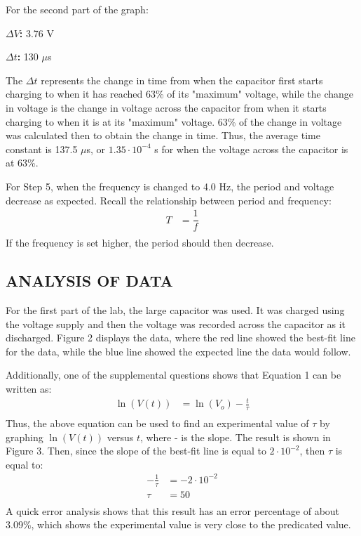 \documentclass [12pt, letterpaper, twoside] {article}
\begin{document}
\noindent
For the second part of the graph:

\textbf{\(\Delta{V}\):} 3.76 V

\textbf{\(\Delta{t}\):} 130 \(\mu\)s

\noindent
The \(\Delta{t}\) represents the change in time from when the capacitor first starts charging to when it has reached 63\% of its "maximum" voltage, while the change in voltage is the change in voltage across the capacitor from when it starts charging to when it is at its "maximum" voltage. 63\% of the change in voltage was calculated then to obtain the change in time. Thus, the average time constant is 137.5 \(\mu\)s, or \(1.35\cdot{10}^{-4}\) s for when the voltage across the capacitor is at 63\%.

\noindent
For Step 5, when the frequency is changed to 4.0 Hz, the period and voltage decrease as expected. Recall the relationship between period and frequency:
\begin{equation*}
  \begin{split}
    T &= \dfrac{1}{f} \\
  \end{split}
\end{equation*}
If the frequency is set higher, the period should then decrease.

\subsection* {ANALYSIS OF DATA}
For the first part of the lab, the large capacitor was used. It was charged using the voltage supply and then the voltage was recorded across the capacitor as it discharged. Figure 2 displays the data, where the red line showed the best-fit line for the data, while the blue line showed the expected line the data would follow. 

\noindent
Additionally, one of the supplemental questions shows that Equation 1 can be written as:
\begin{equation*}
  \begin{split}
    \ln(V(t)) &= \ln(V_{o}) - \frac{t}{\tau} \\
  \end{split}
\end{equation*}
Thus, the above equation can be used to find an experimental value of \(\tau\) by graphing \(\ln(V(t))\) versus \(t\), where - is the slope. The result is shown in Figure 3. Then, since the slope of the best-fit line is equal to \(2\cdot{10}^{-2}\), then \(\tau\) is equal to:
\begin{equation*}
  \begin{split}
    -\tfrac{1}{\tau} &= -2\cdot{10}^{-2} \\
    \tau &= 50 \\
  \end{split}
\end{equation*}
A quick error analysis shows that this result has an error percentage of about 3.09\%, which shows the experimental value is very close to the predicated value.
\end{document}
